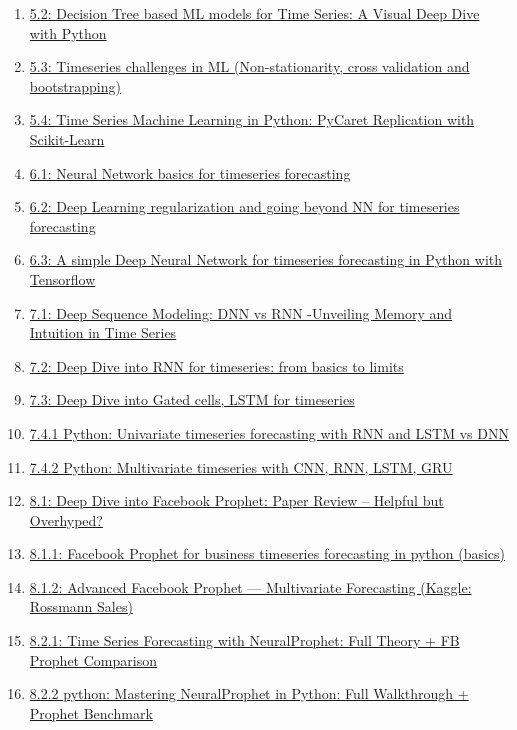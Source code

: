 \documentclass[11pt]{article}
\begin{document}
\begin{enumerate}
	\item \href{https://mp.weixin.qq.com/s/vUWsu-yRgpXWN0Tep0sL8w}{5.2: Decision Tree based ML models for Time Series: A Visual Deep Dive with Python}	%
	\item \href{https://mp.weixin.qq.com/s/kmIoET3reIcTF_o5ZShsJw}{5.3: Timeseries challenges in ML (Non-stationarity, cross validation and bootstrapping)}	%
	\item \href{https://mp.weixin.qq.com/s/BlnhTG8Mj6xr8crsdM8Wrw}{5.4: Time Series Machine Learning in Python: PyCaret Replication with Scikit-Learn}	%
	\item \href{https://mp.weixin.qq.com/s/dKlL60dhri6K4onsruyB3A}{6.1: Neural Network basics for timeseries forecasting}	%
	\item \href{https://mp.weixin.qq.com/s/zzyjS2uuuBKLNZ2TL7UvYw}{6.2: Deep Learning regularization and going beyond NN for timeseries forecasting}	%
	\item \href{https://mp.weixin.qq.com/s/bOyvNXURG0Rfzbe_Pw4sRQ}{6.3: A simple Deep Neural Network for timeseries forecasting in Python with Tensorflow}	%
	\item \href{https://mp.weixin.qq.com/s/O79oaIcIg62KREA2umWoGA}{7.1: Deep Sequence Modeling: DNN vs RNN -Unveiling Memory and Intuition in Time Series}	%
	\item \href{https://mp.weixin.qq.com/s/zJ5BuNv75vbU_yjeH6gmOA}{7.2: Deep Dive into RNN for timeseries: from basics to limits}	%
	\item \href{https://mp.weixin.qq.com/s/dhEnKeBFFc09pGuipPKruA}{7.3: Deep Dive into Gated cells, LSTM for timeseries}	%
	\item \href{https://mp.weixin.qq.com/s/8bq0wFWIz3K4AEwOz6rZhQ}{7.4.1 Python: Univariate timeseries forecasting with RNN and LSTM vs DNN}	%
	\item \href{https://mp.weixin.qq.com/s/NOQ5dhJIQoTGvQiHMY2--A}{7.4.2 Python: Multivariate timeseries with CNN, RNN, LSTM, GRU}	%
	\item \href{https://mp.weixin.qq.com/s/AqwPFO7ctN3KKp1O5aG9yA}{8.1: Deep Dive into Facebook Prophet: Paper Review – Helpful but Overhyped?}	%
	\item \href{https://mp.weixin.qq.com/s/hUrWMy8_8n1DkwsRlw14Eg}{8.1.1: Facebook Prophet for business timeseries forecasting in python (basics)}	%
	\item \href{https://mp.weixin.qq.com/s/zBrLnGJ99V4ZgFIfb7I6vw}{8.1.2: Advanced Facebook Prophet — Multivariate Forecasting (Kaggle: Rossmann Sales)}	%
	\item \href{https://mp.weixin.qq.com/s/vJB7a2_jQqBvRWgZwPcMWw}{8.2.1: Time Series Forecasting with NeuralProphet: Full Theory + FB Prophet Comparison}	%
	\item \href{https://mp.weixin.qq.com/s/ePkxQ7-qb5vk21NRdKZsfA}{8.2.2 python: Mastering NeuralProphet in Python: Full Walkthrough + Prophet Benchmark}
\end{enumerate}
\end{document}
